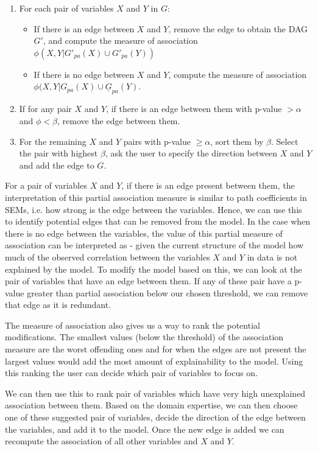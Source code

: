 \documentclass{uai2025} %
\begin{document}
\begin{enumerate}
	\item For each pair of variables $ X $ and $ Y $ in $ G $:
		\begin{itemize}
			\item If there is an edge between $ X $ and $ Y $, remove the edge to obtain the DAG $ G' $, and compute the measure of association $ \phi(X, Y \rvert G'_{pa}(X) \cup G'_{pa}(Y)) $
			\item If there is no edge between $ X $ and $ Y $, compute the measure of association $ \phi(X, Y \rvert G_{pa}(X) \cup \underline{G}_{pa}(Y) $.
		\end{itemize}
	\item If for any pair $ X $ and $ Y $, if there is an edge between them with p-value $ > \alpha $ and $ \phi < \beta $, remove the edge between them.
	\item For the remaining $ X $ and $ Y $ pairs with p-value $ \geq \alpha $, sort them by $ \beta $. Select the pair with highest $ \beta $, ask the user to specify the direction between $ X $ and $ Y $ and add the edge to $ G $.
\end{enumerate}

For a pair of variables $ X $ and $ Y $, if there is an edge present between
them, the interpretation of this partial association measure is similar to path
coefficients in SEMs, i.e. how strong is the edge between the variables. Hence,
we can use this to identify potential edges that can be removed from the model.
In the case when there is no edge between the variables, the value of this
partial measure of association can be interpreted as - given the current
structure of the model how much of the observed correlation between the
variables $ X $ and $ Y $ in data is not explained by the model. To modify the
model based on this, we can look at the pair of variables that have an edge
between them. If any of these pair have a p-value greater than partial
association below our chosen threshold, we can remove that edge as it is
redundant.

The measure of association also gives us a way to rank the potential
modifications. The smallest values (below the threshold) of the association
measure are the worst offending ones and for when the edges are not present the
largest values would add the most amount of explainability to the model. Using
this ranking the user can decide which pair of variables to focus on.

We can then use this to rank pair of variables which have very high unexplained
association between them. Based on the domain expertise, we can then choose one
of these suggested pair of variables, decide the direction of the edge between
the variables, and add it to the model. Once the new edge is added we can
recompute the association of all other variables and $ X $ and $ Y $.
\end{document}
